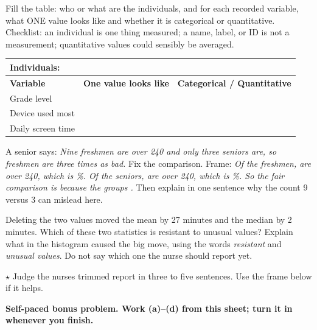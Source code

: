 \documentclass[12pt]{extarticle}
\begin{document}
\begin{description}[leftmargin=1.15in, labelwidth=1in, itemsep=2pt, topsep=2pt]
  \item[\dokbadge{1}~(a)] Fill the table: who or what are the individuals, and for each recorded variable, what ONE value looks like and whether it is categorical or quantitative. Checklist: an individual is one thing measured; a name, label, or ID is not a measurement; quantitative values could sensibly be averaged.\par\smallskip \begin{tabular}{|p{1.3in}|p{2.2in}|p{1.6in}|}\hline \textbf{Individuals:} & \multicolumn{2}{l|}{\hrulefill} \\ \hline \textbf{Variable} & \textbf{One value looks like} & \textbf{Categorical / Quantitative} \\ \hline Grade level & & \\[10pt] \hline Device used most & & \\[10pt] \hline Daily screen time & & \\[10pt] \hline \end{tabular}
  \item[\dokbadge{2}~(b)] A senior says: \emph{Nine freshmen are over 240 and only three seniors are, so freshmen are three times as bad.} Fix the comparison. Frame: \emph{Of the \underline{\hspace{0.4in}} freshmen, \underline{\hspace{0.4in}} are over 240, which is \underline{\hspace{0.4in}}\%. Of the \underline{\hspace{0.4in}} seniors, \underline{\hspace{0.4in}} are over 240, which is \underline{\hspace{0.4in}}\%. So the fair comparison is \underline{\hspace{0.9in}} because the groups \underline{\hspace{0.9in}}.} Then explain in one sentence why the count 9 versus 3 can mislead here.
  \item[\dokbadge{2}~(c)] Deleting the two values moved the mean by 27 minutes and the median by 2 minutes. Which of these two statistics is resistant to unusual values? Explain what in the histogram caused the big move, using the words \emph{resistant} and \emph{unusual values}. Do not say which one the nurse should report yet.
  \item[\dokbadge{3}~(d)] $\star$ Judge the nurse\textquotesingle s trimmed report in three to five sentences. Use the frame below if it helps.
\end{description}

\vfill
\textbf{Self-paced bonus problem. Work (a)--(d) from this sheet; turn it in whenever you finish.}
\end{document}
